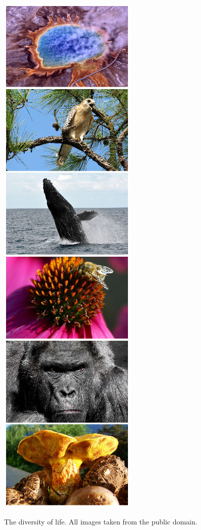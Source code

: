 \documentclass{tufte-book} %
\begin{document}
\begin{marginfigure}
\includegraphics[width=\linewidth]{graphics/diversity-composite.jpg}
\caption{The diversity of life. All images taken from the public domain.}
\label{fig:diversity}
\end{marginfigure}
\end{document}
